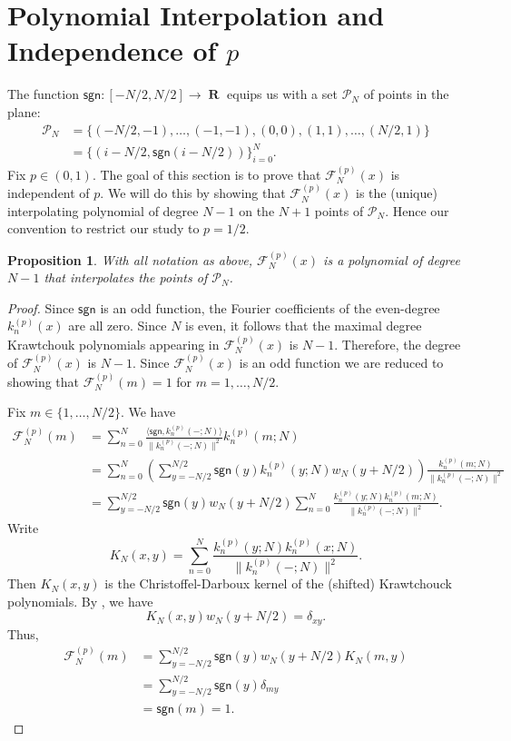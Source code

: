\documentclass{amsart}
\newcommand{\R}{\operatorname{\mathbf{R}}}
\newcommand{\sgn}{\mathsf{sgn}}
\theoremstyle{plain}
\newtheorem{prop}[equation]{Proposition}
\theoremstyle{remark}
\begin{document}
\section{Polynomial Interpolation and Independence of $p$}\label{other_p_section}

The function $\sgn: [-N/2,N/2] \to \R$ equips us with a set $\mathcal{P}_N$ of points in the plane:
\begin{align} \label{points}
\mathcal{P}_N &= \lbrace (-N/2,-1),\dots, (-1,-1), (0,0), (1,1), \dots, (N/2,1) \rbrace \nonumber \\&=  \lbrace (i-N/2,\sgn(i-N/2)) \rbrace_{i=0}^N.
\end{align}
Fix $p \in (0,1)$. The goal of this section is to prove that $\mathcal{F}_N^{(p)}(x)$ is independent of $p$.  We will do this by showing that $\mathcal{F}_N^{(p)}(x)$ is the (unique) interpolating polynomial of degree $N-1$ on the $N+1$ points of $\mathcal{P}_N$. Hence our convention to restrict our study to $p=1/2$. 

\begin{prop} \label{interp_prop}
With all notation as above, $\mathcal{F}_N^{(p)}(x)$ is a polynomial of degree $N-1$ that interpolates the points of $\mathcal{P}_N$.
\end{prop}

\begin{proof}
Since $\sgn$ is an odd function, the Fourier coefficients of the even-degree $k_n^{(p)}(x)$ are all zero.  Since $N$ is even, it follows that the maximal degree Krawtchouk polynomials appearing in $\mathcal{F}_N^{(p)}(x)$ is $N-1$.  Therefore, the degree of $\mathcal{F}_N^{(p)}(x)$ is $N-1$.  Since $\mathcal{F}_N^{(p)}(x)$ is an odd function we are reduced to showing that $\mathcal{F}_N^{(p)}(m) = 1$ for $m=1,\dots,N/2$.  

Fix $m \in \lbrace 1,\dots,N/2 \rbrace$.  We have
\begin{align*}
\mathcal{F}_N^{(p)}(m) &= \sum_{n=0}^N \frac{\langle \sgn,k^{(p)}_n(-;N) \rangle}{\| k^{(p)}_n(-;N) \|^2} k^{(p)}_n(m;N) \\
&= \sum_{n=0}^N \left( \sum_{y=-N/2}^{N/2} \sgn(y)k_n^{(p)}(y;N)w_N(y+N/2) \right) \frac{k_n^{(p)}(m;N)}{\| k^{(p)}_n(-;N) \|^2} \\
&= \sum_{y=-N/2}^{N/2} \sgn(y) w_N(y+N/2) \sum_{n=0}^N \frac{k_n^{(p)}(y;N)k_n^{(p)}(m;N)}{\| k^{(p)}_n(-;N) \|^2}.
\end{align*}
Write
\[
K_N(x,y) = \sum_{n=0}^N \frac{k_n^{(p)}(y;N)k_n^{(p)}(x;N)}{\| k^{(p)}_n(-;N) \|^2}.
\]
Then $K_N(x,y)$ is the Christoffel-Darboux kernel of the (shifted) Krawtchouck polynomials.  By \cite[Thm.~3.1.4]{szego}, we have
\[
K_N(x,y)w_N(y+N/2) = \delta_{xy}.
\]
Thus, 
\begin{align*}
\mathcal{F}_N^{(p)}(m)  &=  \sum_{y=-N/2}^{N/2} \sgn(y) w_N(y+N/2) K_N(m,y) \\
&= \sum_{y=-N/2}^{N/2} \sgn(y) \delta_{my} \\
&= \sgn(m) = 1.
\end{align*}
\end{proof}
\end{document}

